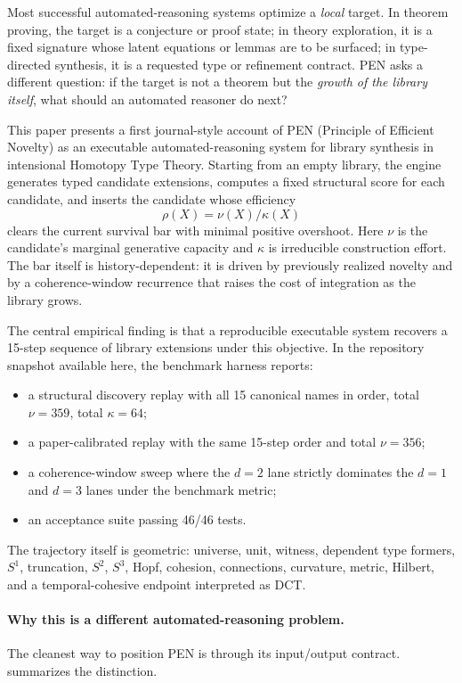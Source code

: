 \documentclass[11pt,a4paper]{article}
\begin{document}
Most successful automated-reasoning systems optimize a \emph{local} target. In theorem proving, the target is a conjecture or proof state; in theory exploration, it is a fixed signature whose latent equations or lemmas are to be surfaced; in type-directed synthesis, it is a requested type or refinement contract. PEN asks a different question: if the target is not a theorem but the \emph{growth of the library itself}, what should an automated reasoner do next?

This paper presents a first journal-style account of PEN (Principle of Efficient Novelty) as an executable automated-reasoning system for library synthesis in intensional Homotopy Type Theory. Starting from an empty library, the engine generates typed candidate extensions, computes a fixed structural score for each candidate, and inserts the candidate whose efficiency
\[
\rho(X)=\nu(X)/\kappa(X)
\]
clears the current survival bar with minimal positive overshoot. Here $\nu$ is the candidate's marginal generative capacity and $\kappa$ is irreducible construction effort. The bar itself is history-dependent: it is driven by previously realized novelty and by a coherence-window recurrence that raises the cost of integration as the library grows.

The central empirical finding is that a reproducible executable system recovers a 15-step sequence of library extensions under this objective. In the repository snapshot available here, the benchmark harness reports:
\begin{itemize}[nosep]
  \item a structural discovery replay with all 15 canonical names in order, total $\nu=359$, total $\kappa=64$;
  \item a paper-calibrated replay with the same 15-step order and total $\nu=356$;
  \item a coherence-window sweep where the $d=2$ lane strictly dominates the $d=1$ and $d=3$ lanes under the benchmark metric;
  \item an acceptance suite passing 46/46 tests.
\end{itemize}
The trajectory itself is geometric: universe, unit, witness, dependent type formers, $S^1$, truncation, $S^2$, $S^3$, Hopf, cohesion, connections, curvature, metric, Hilbert, and a temporal-cohesive endpoint interpreted as DCT.

\paragraph{Why this is a different automated-reasoning problem.}
The cleanest way to position PEN is through its input/output contract.  summarizes the distinction.
\end{document}
